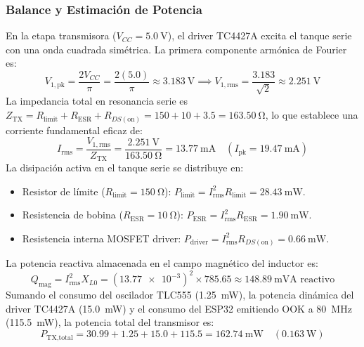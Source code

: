 \subsubsection{Balance y Estimación de Potencia}
En la etapa transmisora ($V_{CC} = \SI{5.0}{\volt}$), el driver TC4427A excita el tanque serie con una onda cuadrada simétrica. La primera componente armónica de Fourier es:
\begin{equation}
    V_{1,\text{pk}} = \frac{2 V_{CC}}{\pi} = \frac{2 (5.0)}{\pi} \approx \SI{3.183}{\volt} \implies V_{1,\text{rms}} = \frac{3.183}{\sqrt{2}} \approx \SI{2.251}{\volt}
\end{equation}
La impedancia total en resonancia serie es $Z_{\text{TX}} = R_{\text{limit}} + R_{\text{ESR}} + R_{DS(\text{on})} = 150 + 10 + 3.5 = \SI{163.50}{\ohm}$, lo que establece una corriente fundamental eficaz de:
\begin{equation}
    I_{\text{rms}} = \frac{V_{1,\text{rms}}}{Z_{\text{TX}}} = \frac{\SI{2.251}{\volt}}{\SI{163.50}{\ohm}} = \SI{13.77}{\milli\ampere} \quad (I_{\text{pk}} = \SI{19.47}{\milli\ampere})
\end{equation}
La disipación activa en el tanque serie se distribuye en:
\begin{itemize}
    \item Resistor de límite ($R_{\text{limit}} = \SI{150}{\ohm}$): $P_{\text{limit}} = I_{\text{rms}}^2 R_{\text{limit}} = \SI{28.43}{\milli\watt}$.
    \item Resistencia de bobina ($R_{\text{ESR}} = \SI{10}{\ohm}$): $P_{\text{ESR}} = I_{\text{rms}}^2 R_{\text{ESR}} = \SI{1.90}{\milli\watt}$.
    \item Resistencia interna MOSFET driver: $P_{\text{driver}} = I_{\text{rms}}^2 R_{DS(\text{on})} = \SI{0.66}{\milli\watt}$.
\end{itemize}
La potencia reactiva almacenada en el campo magnético del inductor es:
\begin{equation}
    Q_{\text{mag}} = I_{\text{rms}}^2 X_{L0} = (\num{13.77e-3})^2 \times 785.65 \approx \SI{148.89}{\milli\volt\ampere\text{ reactivo}}
\end{equation}
Sumando el consumo del oscilador TLC555 (\SI{1.25}{\milli\watt}), la potencia dinámica del driver TC4427A (\SI{15.0}{\milli\watt}) y el consumo del ESP32 emitiendo OOK a \SI{80}{\mega\hertz} (\SI{115.5}{\milli\watt}), la potencia total del transmisor es:
\begin{equation}
    P_{\text{TX,total}} = 30.99 + 1.25 + 15.0 + 115.5 = \SI{162.74}{\milli\watt} \quad (\SI{0.163}{\watt})
\end{equation}


